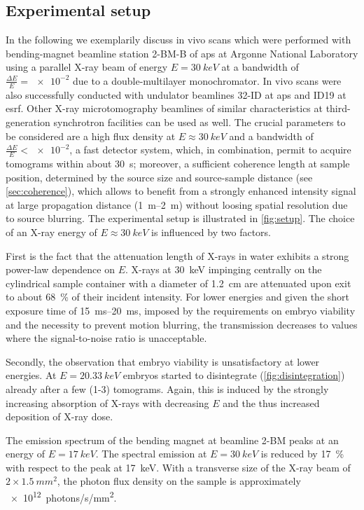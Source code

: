 \documentclass[
twoside,
openright,
titlepage,
numbers=noenddot,
headinclude,
fleqn,
a4paper,
footinclude=true,
cleardoublepage=empty,
abstractoff,
BCOR=5mm,
paper=a4,
fontsize=11pt,
british,ngerman,american,
]{scrreprt}
\begin{document}
\subsection{Experimental setup}
\label{sec:setup}

In the following we exemplarily discuss in vivo scans which were
performed with bending-magnet beamline station 2-BM-B of \ac{aps} at
Argonne National Laboratory using a parallel X-ray beam of energy
$E=\SI{30}{keV}$ at a bandwidth of $\frac{\Delta E}{E} = \num{e-2}$
due to a double-multilayer monochromator.  In vivo scans were also
successfully conducted with undulator beamlines 32-ID at \ac{aps} and
ID19 at \ac{esrf}.  Other X-ray microtomography beamlines of similar
characteristics at third-generation synchrotron facilities can be used
as well.  The crucial parameters to be considered are a high flux
density at $E\approx\SI{30}{keV}$ and a bandwidth of $\frac{\Delta
  E}{E}<\num{e-2}$, a fast detector system, which, in combination,
permit to acquire tomograms within about \SI{30}{s}; moreover, a
sufficient coherence length at sample position, determined by the
source size and source-sample distance (see \cref{sec:coherence}),
which allows to benefit from a strongly enhanced intensity signal at
large propagation distance (\SIrange{1}{2}{m}) without loosing spatial
resolution due to source blurring.  The experimental setup is
illustrated in \cref{fig:setup}.  The choice of an X-ray energy of
$E\approx\SI{30}{keV}$ is influenced by two factors.

First is the fact that the attenuation length of X-rays in water
exhibits a strong power-law dependence on $E$.  \Eg{} X-rays at
\SI{30}{keV} impinging centrally on the cylindrical sample container
with a diameter of \SI{1.2}{cm} are attenuated upon exit
to about \SI{68}{\percent} of their incident intensity.  For lower
energies and given the short exposure time of \SIrange{15}{20}{ms},
imposed by the requirements on embryo viability and the necessity to
prevent motion blurring, the transmission decreases to values where
the signal-to-noise ratio is unacceptable.  

Secondly, the observation that embryo viability is unsatisfactory at
lower energies.  At $E = \SI{20.33}{keV}$  embryos started to
disintegrate (\cref{fig:disintegration}) already after a few (1-3)
tomograms.  Again, this is induced by the strongly increasing
absorption of X-rays with decreasing $E$ and the thus increased
deposition of X-ray dose.  

The emission spectrum of the bending magnet at beamline 2-BM peaks at
an energy of $E = \SI{17}{keV}$.  The spectral emission at $E
=\SI{30}{keV}$ is reduced by \SI{17}{\percent} with respect to the peak
at \SI{17}{keV}.  With a transverse size of the X-ray beam of
$\num{2}\times\SI{1.5}{mm^2}$, the photon flux density on the sample
is approximately \SI{e12}{photons/s/mm^2}.
\end{document}
